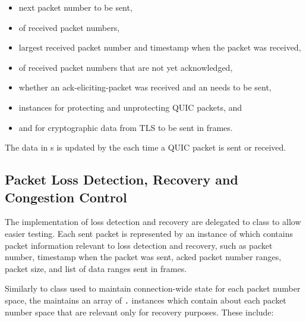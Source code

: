 \begin{itemize}

  \item next packet number to be sent,

  \item \PacketNumberWindow{} of received packet numbers,

  \item largest received packet number and timestamp when the packet was received,

  \item \RangeSet{} of received packet numbers that are not yet acknowledged,

  \item whether an \gls{ack-eliciting-packet} was received and an \ACK{} needs to be sent,

  \item \CryptoSeal{} instances for protecting and unprotecting QUIC packets, and

  \item \SendStream{} and \ReceiveStream{} for cryptographic data from TLS to be sent in \CRYPTO{} frames.

\end{itemize}

The data in \PacketNumberSpace{}s is updated by the \ManagedQuicConnection{} each time a QUIC packet
is sent or received.

\subsection{Packet Loss Detection, Recovery and Congestion Control}

The implementation of loss detection and recovery are delegated to \RecoveryController{} class to
allow easier testing. Each sent packet is represented by an instance of \SentPacket{} which contains
packet information relevant to loss detection and recovery, such as packet number, timestamp when
the packet was sent, acked packet number ranges, packet size, and list of data ranges sent in
\STREAM{} frames.

Similarly to \PacketNumberSpace{} class used to maintain connection-wide state for each packet
number space, the \RecoveryController{} maintains an array of
\texttt{\RecoveryController{}.\PacketNumberSpace{}} instances which contain about each packet number
space that are relevant only for recovery purposes. These include:

